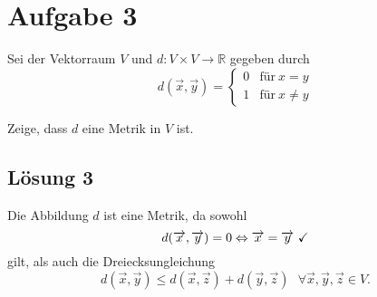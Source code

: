 \documentclass[main.tex]{subfiles}
\begin{document}
\section{Aufgabe 3}

Sei der Vektorraum $V$ und $d:V\times V\rightarrow \mathbb{R}$ gegeben durch
\begin{equation*}
    d(\vec{x} ,\vec{y}) =\begin{cases}
    0 & \text{für} \ x=y\\
    1 & \text{für} \ x\neq y
    \end{cases}
\end{equation*}

Zeige, dass $d$ eine Metrik in $V$ ist.

\subsection{Lösung 3}
Die Abbildung $d$ ist eine Metrik, da sowohl
\begin{equation*}
    d(\overrightarrow{x} ,\overrightarrow{y}) =0\Leftrightarrow \overrightarrow{x} =\overrightarrow{y} \ \checkmark
\end{equation*}
gilt, als auch die Dreiecksungleichung
\begin{equation*}
    d(\vec{x} ,\vec{y}) \leq d(\vec{x} ,\vec{z}) +d(\vec{y} ,\vec{z}) \ \ \ \forall \vec{x} ,\vec{y} ,\vec{z} \in V.
\end{equation*}
\end{document}
